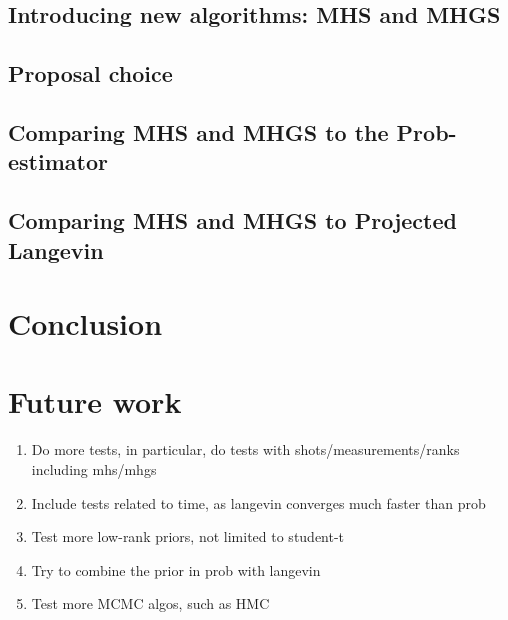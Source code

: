 \documentclass[12pt]{memoir}
\begin{document}
\section{Introducing new algorithms: MHS and MHGS}

\section{Proposal choice}

\section{Comparing MHS and MHGS to the Prob-estimator}

\section{Comparing MHS and MHGS to Projected Langevin}


\chapter{Conclusion}

\chapter{Future work}
\begin{enumerate}
    \item Do more tests, in particular, do tests with shots/measurements/ranks including mhs/mhgs
    \item Include tests related to time, as langevin converges much faster than prob
    \item Test more low-rank priors, not limited to student-t
    \item Try to combine the prior in prob with langevin
    \item Test more MCMC algos, such as HMC
\end{enumerate}

% 
% 
\printbibliography


\end{document}

